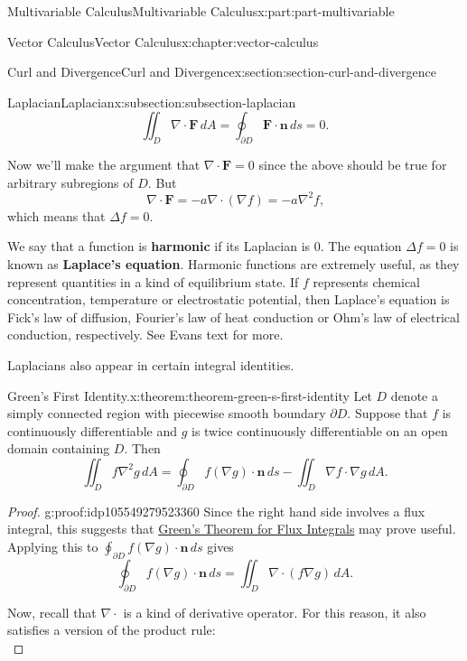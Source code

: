 \documentclass[twoside,10pt,]{book}
\newcommand{\terminology}[1]{\textbf{#1}}
\numberwithin{equation}{part}
\newcommand{\grad}{\nabla}
\renewcommand{\div}{\nabla\cdot}
\newcommand{\del}{\nabla}
\newcommand{\vb}[1]{\mathbf{#1}}
\newcommand{\dn}{\cdot\vb{n}\,ds}
\begin{document}
\begin{partptx}{Multivariable Calculus}{}{Multivariable Calculus}{}{}{x:part:part-multivariable}
\begin{chapterptx}{Vector Calculus}{}{Vector Calculus}{}{}{x:chapter:vector-calculus}
\begin{sectionptx}{Curl and Divergence}{}{Curl and Divergence}{}{}{x:section:section-curl-and-divergence}
\begin{subsectionptx}{Laplacian}{}{Laplacian}{}{}{x:subsection:subsection-laplacian}
\begin{equation*}
\iint_{D}\div\vb{F}\,dA = \oint_{\partial D}\vb{F}\cdot\vb{n}\,ds = 0\text{.}
\end{equation*}
%
\par
Now we'll make the argument that \(\div\vb{F} = 0\) since the above should be true for arbitrary subregions of \(D\). But%
\begin{equation*}
\div\vb{F} = -a\div(\grad f) = -a\del^{2}f\text{,}
\end{equation*}
which means that \(\Delta f = 0\).%
\par
We say that a function is \terminology{harmonic} if its Laplacian is \(0\). The equation \(\Delta f = 0\) is known as \terminology{Laplace's equation}. Harmonic functions are extremely useful, as they represent quantities in a kind of equilibrium state. If \(f\) represents chemical concentration, temperature or electrostatic potential, then Laplace's equation is Fick's law of diffusion, Fourier's law of heat conduction or Ohm's law of electrical conduction, respectively. See Evans text for more.%
\par
Laplacians also appear in certain integral identities.%
\begin{theorem}{Green's First Identity.}{}{x:theorem:theorem-green-s-first-identity}%
%
Let \(D\) denote a simply connected region with piecewise smooth boundary \(\partial D\). Suppose that \(f\) is continuously differentiable and \(g\) is twice continuously differentiable on an open domain containing \(D\). Then%
\begin{equation*}
\iint_{D}f\del^{2}g\,dA = \oint_{\partial D}f(\grad g)\dn - \iint_{D}\grad f\cdot \grad g\,dA\text{.}
\end{equation*}
%
\end{theorem}
\begin{proof}{}{g:proof:idp105549279523360}
Since the right hand side involves a flux integral, this suggests that \hyperref[x:theorem:theorem-green-s-theorem-for-flux-integrals]{Green's Theorem for Flux Integrals} may prove useful. Applying this to \(\oint_{\partial D}f(\grad g)\dn\) gives%
\begin{equation*}
\oint_{\partial D}f(\grad g)\dn = \iint_{D}\div(f\grad g)\,dA\text{.}
\end{equation*}
%
\par
Now, recall that \(\div\) is a kind of derivative operator. For this reason, it also satisfies a version of the product rule:%
\begin{equation*}

\end{equation*}
\end{proof}
\end{subsectionptx}
\end{sectionptx}
\end{chapterptx}
\end{partptx}
\end{document}
